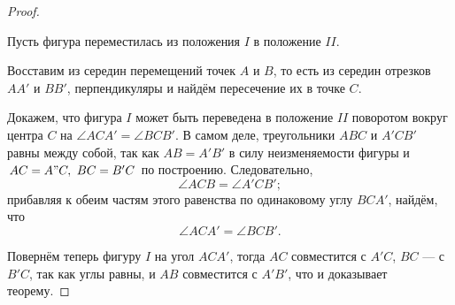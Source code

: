\begin{proof}
  \begin{figure}[H]
    \centering

    \caption{}
    \label{fig:15_3}
  \end{figure}

  Пусть фигура переместилась из положения $I$ в положение $II$.

  Восставим из середин перемещений точек $A$ и $B$, то есть из середин отрезков
  $AA'$ и $BB'$, перпендикуляры и найдём пересечение их в точке $C$.

  Докажем, что фигура $I$ может быть переведена в положение $II$ поворотом
  вокруг центра $C$ на $\angle ACA' = \angle BCB'$. В самом деле, треугольники
  $ABC$ и $A'CB'$ равны между собой, так как $AB = A'B'$ в силу неизменяемости
  фигуры и $AC = A"C,~BC = B'C$ по построению. Следовательно,
  \begin{equation*}
    \angle ACB = \angle A'CB';
  \end{equation*}
  прибавляя к обеим частям этого равенства по одинаковому углу $BCA'$, найдём,
  что
  \begin{equation*}
    \angle ACA' = \angle BCB'.
  \end{equation*}

  Повернём теперь фигуру $I$ на угол $ACA'$, тогда $AC$ совместится с $A'C$,
  $BC$ --- с $B'C$, так как углы равны, и $AB$ совместится с $A'B'$, что и
  доказывает теорему.
\end{proof}

